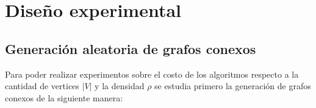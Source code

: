 \documentclass[11pt]{article}
\begin{document}

\newpage

\section{Diseño experimental}

\subsection{Generación aleatoria de grafos conexos}
Para poder realizar experimentos sobre el costo de los algoritmos respecto a la cantidad de vertices $|V|$ y la densidad $\rho$ se estudia primero la generación de grafos conexos de la siguiente manera:
\end{document}
